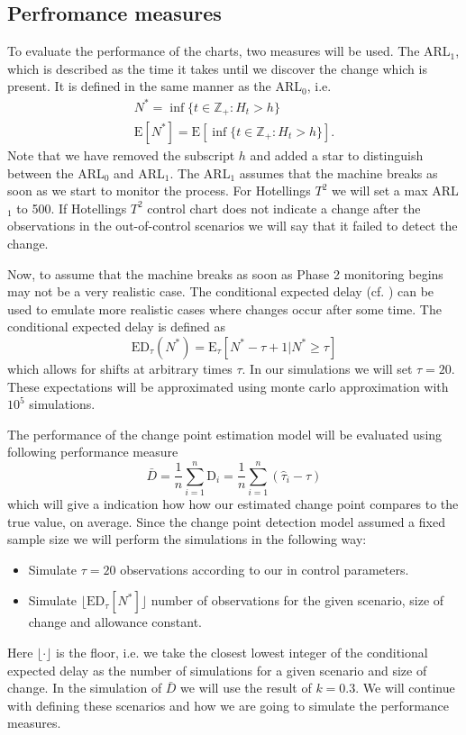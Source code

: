 \documentclass[a4paper,11pt,fleqn,twoside,notitlepage]{report}\usepackage[]{graphicx}\usepackage[]{color}
\begin{document}
\subsection{Perfromance measures}
To evaluate the performance of the charts, two measures will be used. The ARL$_1$, which is described as the time it takes until we discover the change which is present. It is defined in the same manner as the ARL$_0$, i.e.
\begin{align}
&N^*=\inf \{t \in \mathbb{Z}_+: H_t>h \}& \\\nonumber
&\text{E}[N^*] = \text{E}[\inf \{t \in \mathbb{Z}_+: H_t>h \}].& 
\end{align}
Note that we have removed the subscript $h$ and added a star to distinguish between the ARL$_0$ and ARL$_1$. The ARL$_1$ assumes that the machine breaks as soon as we start to monitor the process. For Hotellings $T^2$ we will set a max ARL$_1$ to 500. If Hotellings $T^2$ control chart does not indicate a change after the observations in the out-of-control scenarios we will say that it failed to detect the change.

Now, to assume that the machine breaks as soon as Phase 2 monitoring begins may not be a very realistic case. The conditional expected delay (cf. \cite{ED}) can be used to emulate more realistic cases where changes occur after some time. The conditional expected delay is defined as 
$$
\text{ED}_{\tau}(N^*) = \text{E}_{\tau}[N^*-\tau+1|N^*\geq \tau]
$$
which allows for shifts at arbitrary times $\tau$. In our simulations we will set $\tau=20$. These expectations will be approximated using monte carlo approximation with $10^5$ simulations.

The performance of the change point estimation model will be evaluated using following performance measure
$$
\bar{D}=\frac{1}{n}\sum_{i=1}^n \text{D}_i=\frac{1}{n}\sum_{i=1}^n \left(\hat{\tau}_i-\tau \right)
$$
which will give a indication how how our estimated change point compares to the true value, on average. Since the change point detection model assumed a fixed sample size we will perform the simulations in the following way: 
\begin{itemize}
\item Simulate $\tau=20$ observations according to our in control parameters.
\item Simulate $\lfloor \text{ED}_{\tau}[N^*] \rfloor$ number of observations for the given scenario, size of change and allowance constant. 
\end{itemize}
Here $\lfloor \cdot \rfloor$ is the floor, i.e. we take the closest lowest integer of the conditional expected delay as the number of simulations for a given scenario and size of change. In the simulation of $\bar{D}$ we will use the result of $k=0.3$. 
We will continue with defining these scenarios and how we are going to simulate the performance measures.
\end{document}
